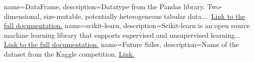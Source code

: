 
{
    name=DataFrame,
    description={Datatype from the Pandas library. Two-dimensional, size-mutable, potentially heterogeneous tabular data.... \href{https://pandas.pydata.org/pandas-docs/stable/reference/api/pandas.DataFrame.html}{Link to the full documentation.}}
}
{
    name=scikit-learn,
    description={Scikit-learn is an open source machine learning library that supports supervised and unsupervised learning... \href{https://scikit-learn.org/stable/getting_started.html}{Link to the full documentation.}}
}
{
    name=Future Sales,
    description={Name of the dataset from the Kaggle competition. \href{https://www.kaggle.com/c/competitive-data-science-predict-future-sales/}{Link.}}
}
